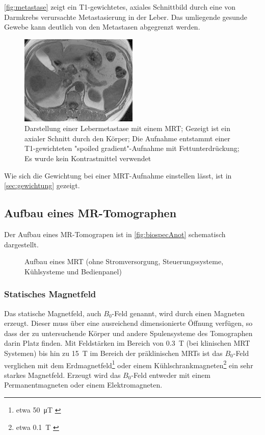 \autoref{fig:metastase} zeigt ein T1-gewichtetes, axiales Schnittbild durch eine von Darmkrebs verursachte Metastasierung in der Leber. Das umliegende gesunde Gewebe kann deutlich von den Metastasen abgegrenzt werden.

\begin{figure}[H]
	\centering
	\includegraphics[width=0.5\textwidth]{img/ext/metastase.png}
	\caption[Lebermetastase]{Darstellung einer Lebermetastase mit einem MRT; Gezeigt ist ein axialer Schnitt durch den Körper; Die Aufnahme entstammt einer T1-gewichteten "spoiled gradient"-Aufnahme mit Fettunterdrückung; Es wurde kein Kontrastmittel verwendet \cite[S.~872]{Reiser2008}}
	\label{fig:metastase}
\end{figure}

Wie sich die Gewichtung bei einer MRT-Aufnahme einstellen lässt, ist in \autoref{sec:gewichtung} gezeigt.

\subsection{Aufbau eines MR-Tomographen}
Der Aufbau eines MR-Tomograpen ist in \autoref{fig:biospecAnot} schematisch dargestellt.

\begin{figure}[H]
	\centering
	\caption[Aufbau MR-Tomographen]{Aufbau eines MRT (ohne Stromversorgung, Steuerungssysteme, Kühlsysteme und Bedienpanel)}
	\label{fig:biospecAnot}
\end{figure}

\subsubsection{Statisches Magnetfeld}
Das statische Magnetfeld, auch $B_0$-Feld genannt, wird durch einen Magneten erzeugt. Dieser muss über eine ausreichend dimensionierte Öffnung verfügen, so dass der zu untersuchende Körper und andere Spulensysteme des Tomographen darin Platz finden. Mit Feldstärken im Bereich von \SI{0.3}{\tesla} (bei klinischen MRT Systemen) bis hin zu \SI{15}{\tesla} im Bereich der präklinischen MRTs ist das $B_0$-Feld verglichen mit dem Erdmagnetfeld\footnote{etwa \SI{50}{\micro\tesla} \cite{Enc1994}} oder einem Kühlschrankmagneten\footnote{etwa \SI{0.1}{\tesla} \cite{LHC2018}} ein sehr starkes Magnetfeld.
Erzeugt wird das $B_0$-Feld entweder mit einem Permanentmagneten oder einem Elektromagneten. 

